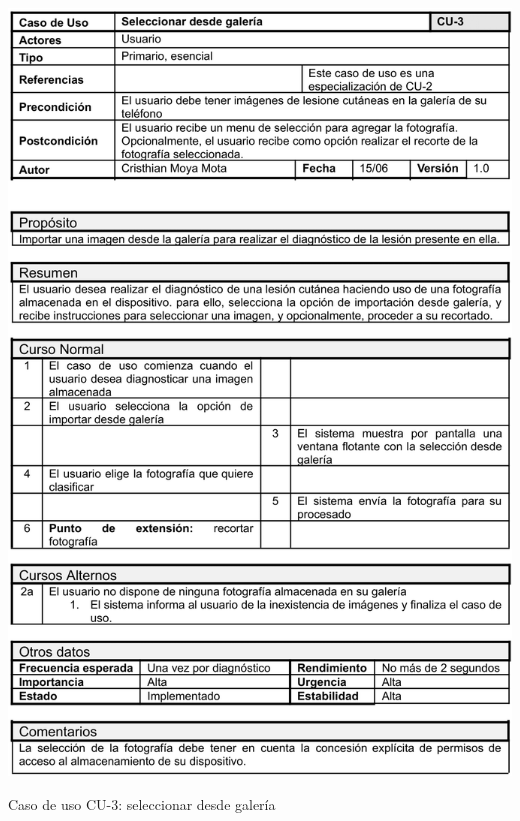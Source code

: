   \begin{table}[H]
	\centering
	\includegraphics[scale=0.85]{imagenes/cu-3.png}
	\caption{Caso de uso CU-3: seleccionar desde galería}
	\label{fig:cu3}
\end{table}

